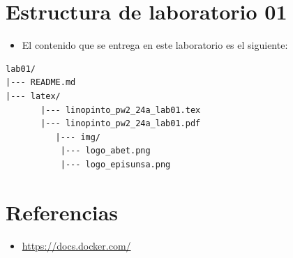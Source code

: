 \documentclass{article}
\newcommand{\itemPracticeNumber}{01}
\begin{document}
\section{Estructura de laboratorio \itemPracticeNumber}
\begin{itemize}
	\item El contenido que se entrega en este laboratorio es el siguiente:
\end{itemize}
\begin{lstlisting}[style=ascii-tree]
lab01/
|--- README.md
|--- latex/
	   |--- linopinto_pw2_24a_lab01.tex
	   |--- linopinto_pw2_24a_lab01.pdf
          |--- img/
	       |--- logo_abet.png
	       |--- logo_episunsa.png
\end{lstlisting}

\section{Referencias}
\begin{itemize}
	\item \url{https://docs.docker.com/}
\end{itemize}

%
%
%
\end{document}

